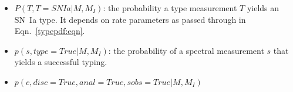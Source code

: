 \documentclass[preprint,3p]{elsarticle}
\begin{document}
\begin{itemize}
\item $P(T, T=SNIa| M, M_I)$: the probability a type measurement $T$ yields an SN~Ia type.  It depends
on rate parameters as passed through in Eqn.~\ref{typepdf:eqn}.
\item $p(s, type=True | M, M_I)$: the probability of a spectral measurement $s$ that yields a successful typing.
\item $p(c, disc=True, anal=True, sobs=True| M, M_I)$
\end{itemize}
%
\end{document}

